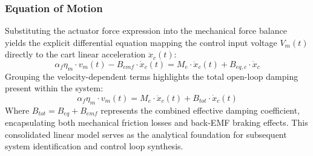 \documentclass[11pt,a4paper]{article}
\begin{document}
\subsubsection{Equation of Motion}\label{subsub:cart_eom}
Substituting the actuator force expression into the mechanical force balance yields the explicit differential equation mapping the control input voltage $V_m(t)$ directly to the cart linear acceleration $\ddot{x}_c(t)$:
\begin{equation*}
    \alpha_f \eta_m \cdot v_m(t) - B_{emf}\cdot \dot{x}_c(t) = M_e \cdot \ddot{x}_c(t) + B_{eq,c}\cdot \dot{x}_c
\end{equation*}
Grouping the velocity-dependent terms highlights the total open-loop damping present within the system:
\begin{equation}
\label{eq:cart_eom}
    \alpha_f \eta_m \cdot v_m(t) = M_e \cdot \ddot{x}_c(t) + B_{tot}\cdot \dot{x}_c(t)
\end{equation}
Where $B_{tot} = B_{eq} + B_{emf}$ represents the combined effective damping coefficient, encapsulating both mechanical friction losses and back-EMF braking effects. This consolidated linear model serves as the analytical foundation for subsequent system identification and control loop synthesis. 
\end{document}
